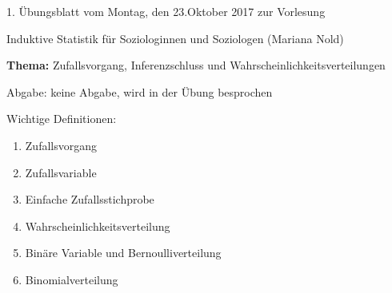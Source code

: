 \documentclass[11pt]{article}
\newcommand{\VORLESUNG}{Induktive Statistik für Soziologinnen und Soziologen}
\newcommand{\STAFF}{Mariana Nold}
\newcommand{\ASSIGNMENT}{1}
\newcommand{\HANDOUT}{Montag, den 23.Oktober   2017}
\newcommand{\DELIVER}{keine Abgabe, wird in der Übung besprochen}
\newcommand{\PRACTICAL}[1]{\marginpar{\tiny {\bf Aufgabe \\ abgeben!} #1}}
\newcommand{\titel}{Zufallsvorgang, Inferenzschluss und Wahrscheinlichkeitsverteilungen}
\begin{document}

\begin{center}
\ASSIGNMENT{}. Übungsblatt vom \HANDOUT{} zur Vorlesung 
\vspace*{0.5cm}

{\Large \VORLESUNG{}}
(\STAFF{}) 


\vspace*{0.5cm}
{\textbf{Thema:} \titel{}\\}
\vspace*{0.2cm}

{\small Abgabe: \DELIVER{}}
\vspace*{1cm}
\end{center}

Wichtige Definitionen:
\begin{enumerate}
\item{Zufallsvorgang}
\item{Zufallsvariable}
\item{Einfache Zufallsstichprobe}
\item{Wahrscheinlichkeitsverteilung}
\item{Binäre Variable und  Bernoulliverteilung}
\item{Binomialverteilung}
\end{enumerate}
\vspace{2cm}
\end{document}
